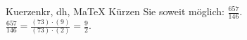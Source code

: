 \begin{MAufgabe}{Kuerzen}{kr, dh, MaTeX}
K\"urzen Sie soweit m\"oglich: $\frac{657}{146}$.\\ 
\ifLsg\MLoesung
\quad $\frac{657}{146}=\frac{(73)\cdot(9)}{(73)\cdot(2)}=\frac{9}{2}$.\else\relax\fi
 \end{MAufgabe}